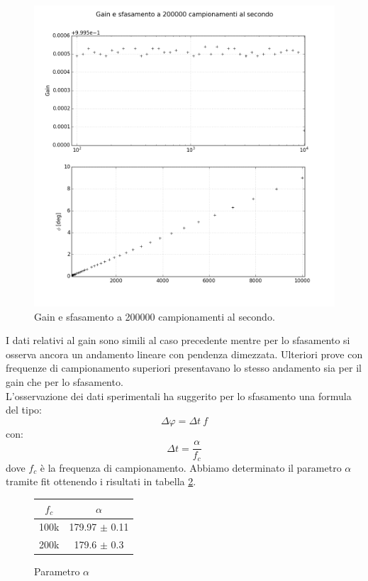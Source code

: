 \documentclass[journal, a4paper]{IEEEtran}
\begin{document}
\begin{figure}[htp]
\centering
\includegraphics[scale=.3]{subplots_errors_amplitude200000}
\caption{Gain e sfasamento a 200000 campionamenti al secondo.}
\label{fig:ampli200000}
\end{figure}

I dati relativi al gain sono simili al caso precedente mentre per lo sfasamento si osserva ancora un andamento lineare con pendenza dimezzata. Ulteriori prove con frequenze di campionamento superiori presentavano lo stesso andamento sia per il gain che per lo sfasamento.\\
L'osservazione dei dati sperimentali ha suggerito per lo sfasamento una formula del tipo:
\begin{equation}
\Delta \varphi  = \Delta t ~ f
\end{equation}
con:
\begin{equation}
\Delta t = \frac{\alpha}{f_c}
\end{equation}
dove $f_c$ è la frequenza di campionamento. Abbiamo determinato il parametro $\alpha$ tramite fit ottenendo i risultati in tabella \ref{tab:alpha}.
\begin{figure}[htp]
\centering
\caption{Parametro $\alpha$}
\begin{tabular}{|c|c|}
\hline 
$f_c$ & $\alpha$ \\ 
\hline 
100k & 179.97 $\pm$ 0.11 \\ 
\hline 
200k & 179.6 $\pm$ 0.3 \\ 
\hline 
\end{tabular} 
\label{tab:alpha}
\end{figure}
\end{document}
